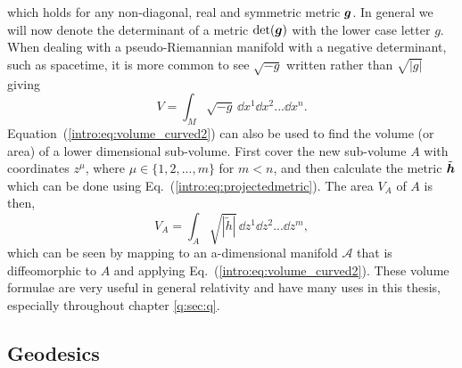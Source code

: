 which holds for any non-diagonal, real and symmetric metric $\boldsymbol{g}$. In general we will now denote the determinant of a metric $\det(\boldsymbol{g})$ with the lower case letter $g$. When dealing with a pseudo-Riemannian manifold with a negative determinant, such as spacetime, it is more common to see $\sqrt{-g}$ written rather than $\sqrt{|g|}$ giving
\begin{equation}
V = \int_{M}\sqrt{-g} \,\dd {x}^1 \dd {x}^2 ... \dd {x}^n.
\end{equation}
Equation~(\ref{intro:eq:volume_curved2}) can also be used to find the volume (or area) of a lower dimensional sub-volume. First cover the new sub-volume $A$ with coordinates $z^\mu$, where $\mu\in\{1,2,...,m\}$ for $m<n$, and then calculate the metric $\tilde{\boldsymbol{h}}$ which can be done using Eq.~(\ref{intro:eq:projectedmetric}). The area $V_A$ of $A$ is then,
\begin{equation} \label{intro:eq:area_int}
V_A = \int_{A}\sqrt{|\tilde{h}|} \,\dd {z}^1 \dd {z}^2 ... \dd {z}^m,
\end{equation}
which can be seen by mapping to an a-dimensional manifold $\mathcal{A}$ that is diffeomorphic to $A$ and applying Eq.~(\ref{intro:eq:volume_curved2}). These volume formulae are very useful in general relativity and have many uses in this thesis, especially throughout chapter \ref{q:sec:q}.


 \subsection{Geodesics} \label{intro:sec:geodesics}

